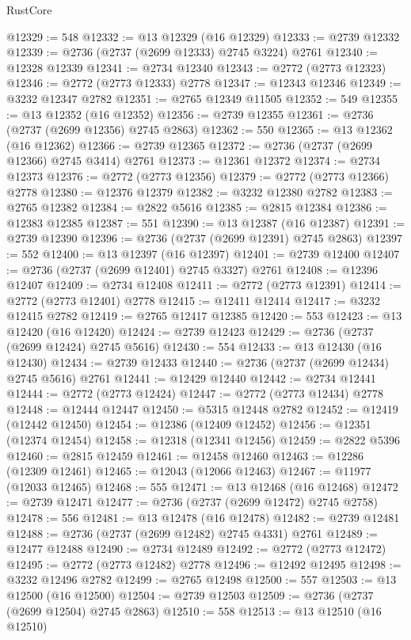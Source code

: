 \begin{lexlean}{RustCore}
\begin{coremodule}
@12329 := 548
@12332 := @13 @12329 (@16 @12329)
@12333 := @2739 @12332
@12339 := @2736 (@2737 (@2699 @12333) @2745 @3224) @2761
@12340 := @12328 @12339
@12341 := @2734 @12340
@12343 := @2772 (@2773 @12323)
@12346 := @2772 (@2773 @12333) @2778
@12347 := @12343 @12346
@12349 := @3232 @12347 @2782
@12351 := @2765 @12349 @11505
@12352 := 549
@12355 := @13 @12352 (@16 @12352)
@12356 := @2739 @12355
@12361 := @2736 (@2737 (@2699 @12356) @2745 @2863)
@12362 := 550
@12365 := @13 @12362 (@16 @12362)
@12366 := @2739 @12365
@12372 := @2736 (@2737 (@2699 @12366) @2745 @3414) @2761
@12373 := @12361 @12372
@12374 := @2734 @12373
@12376 := @2772 (@2773 @12356)
@12379 := @2772 (@2773 @12366) @2778
@12380 := @12376 @12379
@12382 := @3232 @12380 @2782
@12383 := @2765 @12382
@12384 := @2822 @5616
@12385 := @2815 @12384
@12386 := @12383 @12385
@12387 := 551
@12390 := @13 @12387 (@16 @12387)
@12391 := @2739 @12390
@12396 := @2736 (@2737 (@2699 @12391) @2745 @2863)
@12397 := 552
@12400 := @13 @12397 (@16 @12397)
@12401 := @2739 @12400
@12407 := @2736 (@2737 (@2699 @12401) @2745 @3327) @2761
@12408 := @12396 @12407
@12409 := @2734 @12408
@12411 := @2772 (@2773 @12391)
@12414 := @2772 (@2773 @12401) @2778
@12415 := @12411 @12414
@12417 := @3232 @12415 @2782
@12419 := @2765 @12417 @12385
@12420 := 553
@12423 := @13 @12420 (@16 @12420)
@12424 := @2739 @12423
@12429 := @2736 (@2737 (@2699 @12424) @2745 @5616)
@12430 := 554
@12433 := @13 @12430 (@16 @12430)
@12434 := @2739 @12433
@12440 := @2736 (@2737 (@2699 @12434) @2745 @5616) @2761
@12441 := @12429 @12440
@12442 := @2734 @12441
@12444 := @2772 (@2773 @12424)
@12447 := @2772 (@2773 @12434) @2778
@12448 := @12444 @12447
@12450 := @5315 @12448 @2782
@12452 := @12419 (@12442 @12450)
@12454 := @12386 (@12409 @12452)
@12456 := @12351 (@12374 @12454)
@12458 := @12318 (@12341 @12456)
@12459 := @2822 @5396
@12460 := @2815 @12459
@12461 := @12458 @12460
@12463 := @12286 (@12309 @12461)
@12465 := @12043 (@12066 @12463)
@12467 := @11977 (@12033 @12465)
@12468 := 555
@12471 := @13 @12468 (@16 @12468)
@12472 := @2739 @12471
@12477 := @2736 (@2737 (@2699 @12472) @2745 @2758)
@12478 := 556
@12481 := @13 @12478 (@16 @12478)
@12482 := @2739 @12481
@12488 := @2736 (@2737 (@2699 @12482) @2745 @4331) @2761
@12489 := @12477 @12488
@12490 := @2734 @12489
@12492 := @2772 (@2773 @12472)
@12495 := @2772 (@2773 @12482) @2778
@12496 := @12492 @12495
@12498 := @3232 @12496 @2782
@12499 := @2765 @12498
@12500 := 557
@12503 := @13 @12500 (@16 @12500)
@12504 := @2739 @12503
@12509 := @2736 (@2737 (@2699 @12504) @2745 @2863)
@12510 := 558
@12513 := @13 @12510 (@16 @12510)

\end{coremodule}
\end{lexlean}
